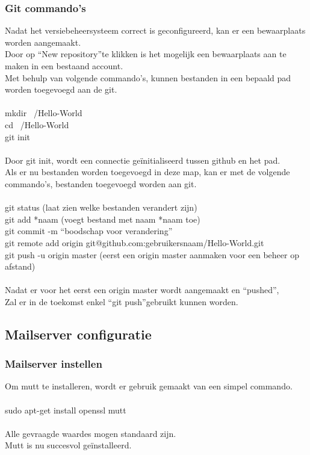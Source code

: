 \documentclass[12pt]{article}
\begin{document}
				\newpage
				\subsubsection{Git commando's}
					Nadat het versiebeheersysteem correct is geconfigureerd, kan er een bewaarplaats worden aangemaakt.\\
					Door op \textquotedblleft New repository\textquotedblright te klikken is het mogelijk een bewaarplaats aan te maken in een bestaand account.\\
					Met behulp van volgende commando's, kunnen bestanden in een bepaald pad worden toegevoegd aan de git.\\
					\\
					 mkdir ~/Hello-World\\
					 cd ~/Hello-World\\
					 git init\\
					 \\
					 Door git init, wordt een connectie ge\"initialiseerd tussen github en het pad.\\
					 Als er nu bestanden worden toegevoegd in deze map, kan er met de volgende commando's, bestanden toegevoegd worden aan git.\\
					 \\
					  git status (laat zien welke bestanden verandert zijn)\\
					  git add *naam (voegt bestand met naam *naam toe)\\
					  git commit -m \textquotedblleft boodschap voor verandering\textquotedblright\\
					  git remote add origin git@github.com:gebruikersnaam/Hello-World.git\\
					  git push -u origin master (eerst een origin master aanmaken voor een beheer op afstand)\\
					  \\
					  Nadat er voor het eerst een origin master wordt aangemaakt en \textquotedblleft pushed\textquotedblright,\\
					  Zal er in de toekomst enkel \textquotedblleft git push\textquotedblright gebruikt kunnen worden.
			
			\newpage
			\subsection{Mailserver configuratie}\label{Mail}
				\subsubsection{Mailserver instellen}
					Om mutt te installeren, wordt er gebruik gemaakt van een simpel commando.\\
					\\					
					sudo apt-get install openssl mutt\\
					\\
					Alle gevraagde waardes mogen standaard zijn.\\
					Mutt is nu succesvol geïnstalleerd.
					
\end{document}
